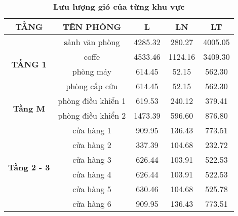 \begin{table}[H]
	\centering
	\caption {\textbf{Lưu lượng gió của từng khu vực}}
	\begin{tabular}{|c|c|c|c|c|}
		\hline
		\textbf{TẦNG} & \textbf{TÊN PHÒNG} & \textbf{L } & \textbf{LN} & \textbf{LT} \bigstrut\\
		\hline
		\multirow{4}[8]{*}{\textbf{TẦNG 1}} & sảnh văn phòng & 4285.32 & 280.27 & 4005.05 \bigstrut\\
		\cline{2-5}      & coffe & 4533.46 & 1124.16 & 3409.30 \bigstrut\\
		\cline{2-5}      & phòng máy & 614.45 & 52.15 & 562.30 \bigstrut\\
		\cline{2-5}      & phòng cấp cứu & 614.45 & 52.15 & 562.30 \bigstrut\\
		\hline
		\multirow{2}[4]{*}{\textbf{Tầng M}} & phòng điều khiển 1 & 619.53 & 240.12 & 379.41 \bigstrut\\
		\cline{2-5}      & phòng điều khiển 2 & 1473.39 & 596.60 & 876.80 \bigstrut\\
		\hline
		\multirow{6}[12]{*}{\textbf{Tầng 2 - 3}} & cửa hàng 1 & 909.95 & 136.43 & 773.51 \bigstrut\\
		\cline{2-5}      & cửa hàng 2 & 337.39 & 104.68 & 232.72 \bigstrut\\
		\cline{2-5}      & cửa hàng 3 & 626.44 & 103.91 & 522.53 \bigstrut\\
		\cline{2-5}      & cửa hàng 4 & 626.44 & 103.91 & 522.53 \bigstrut\\
		\cline{2-5}      & cửa hàng 5 & 630.46 & 104.68 & 525.78 \bigstrut\\
		\cline{2-5}      & cửa hàng 6 & 909.95 & 136.43 & 773.51 \bigstrut\\
		\hline
	\end{tabular}%
\end{table}
\newpage
